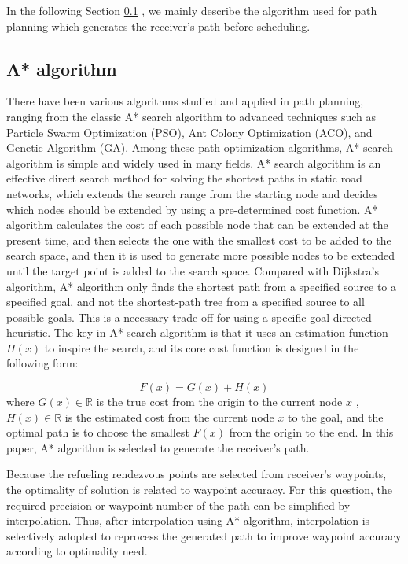 In the following Section \ref{sec_3.2} , we mainly describe the algorithm used for path planning which generates the receiver's path before scheduling.



\subsection{A* algorithm}\label{sec_3.2}

There have been various algorithms studied and applied in path planning, ranging from the classic A* search algorithm to advanced techniques such as Particle Swarm Optimization (PSO), Ant Colony Optimization (ACO), and Genetic Algorithm (GA). Among these path optimization algorithms, A* search algorithm is simple and widely used in many fields. A* search algorithm is an effective direct search method for solving the shortest paths in static road networks, which extends the search range from the starting node and decides which nodes should be extended by using a pre-determined cost function.\cite{li2023app} A* algorithm calculates the cost of each possible node that can be extended at the present time, and then selects the one with the smallest cost to be added to the search space, and then it is used to generate more possible nodes to be extended until the target point is added to the search space. Compared with Dijkstra's algorithm, A* algorithm only finds the shortest path from a specified source to a specified goal, and not the shortest-path tree from a specified source to all possible goals. This is a necessary trade-off for using a specific-goal-directed heuristic. The key in A* search algorithm is that it uses an estimation function $H\left(x\right)$  to inspire the search, and its core cost function is designed in the following form:

\begin{equation}
F(x)=G(x)+H(x)
\label{eq:15.31}
\end{equation}
where  $G(x)\in\mathbb{R}$ is the true cost from the origin to the current node $x$ ,  $H(x)\in\mathbb{R}$ is the estimated cost from the current node $x$ to the goal, and the optimal path is to choose the smallest $F(x)$  from the origin to the end. In this paper, A* algorithm is selected to generate the receiver's path. 

Because the refueling rendezvous points are selected from receiver's waypoints, the optimality of solution is related to waypoint accuracy. For this question, the required precision or waypoint number of the path can be simplified by interpolation. Thus, after interpolation using A* algorithm, interpolation is selectively adopted to reprocess the generated path to improve waypoint accuracy according to optimality need.





